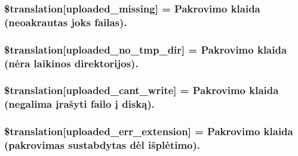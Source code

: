 \subsubsection[{\$translation}]{\setlength{\rightskip}{0pt plus 5cm}\$translation\mbox{[}\textquotesingle{}uploaded\+\_\+missing\textquotesingle{}\mbox{]} = \textquotesingle{}Pakrovimo klaida (neoakrautas joks failas).\textquotesingle{}}\label{class_8upload_8lt___l_t_8php_a0cce433260be65f1f35853a6b4b8952b}
\hypertarget{class_8upload_8lt___l_t_8php_ae3cdc68fe248399f77246c91b0555341}{}
\subsubsection[{\$translation}]{\setlength{\rightskip}{0pt plus 5cm}\$translation\mbox{[}\textquotesingle{}uploaded\+\_\+no\+\_\+tmp\+\_\+dir\textquotesingle{}\mbox{]} = \textquotesingle{}Pakrovimo klaida (nėra laikinos direktorijos).\textquotesingle{}}\label{class_8upload_8lt___l_t_8php_ae3cdc68fe248399f77246c91b0555341}
\hypertarget{class_8upload_8lt___l_t_8php_af368fee3b41bc05e6b208c1557a00c00}{}
\subsubsection[{\$translation}]{\setlength{\rightskip}{0pt plus 5cm}\$translation\mbox{[}\textquotesingle{}uploaded\+\_\+cant\+\_\+write\textquotesingle{}\mbox{]} = \textquotesingle{}Pakrovimo klaida (negalima įrašyti failo į diską).\textquotesingle{}}\label{class_8upload_8lt___l_t_8php_af368fee3b41bc05e6b208c1557a00c00}
\hypertarget{class_8upload_8lt___l_t_8php_a01c69a4c8556602b3892dce727bace11}{}
\subsubsection[{\$translation}]{\setlength{\rightskip}{0pt plus 5cm}\$translation\mbox{[}\textquotesingle{}uploaded\+\_\+err\+\_\+extension\textquotesingle{}\mbox{]} = \textquotesingle{}Pakrovimo klaida (pakrovimas sustabdytas dėl išplėtimo).\textquotesingle{}}\label{class_8upload_8lt___l_t_8php_a01c69a4c8556602b3892dce727bace11}
\hypertarget{class_8upload_8lt___l_t_8php_a4a9168e922b827e6a28b5db1c00774ca}{}
